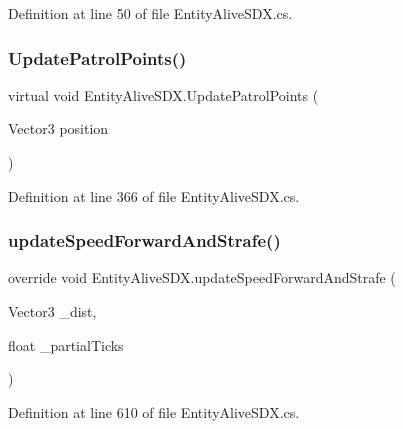 Definition at line 50 of file Entity\+Alive\+S\+D\+X.\+cs.

\mbox{\label{class_entity_alive_s_d_x_a7a31604214486ba310819d2f39be38cc}} 
\subsubsection{\texorpdfstring{UpdatePatrolPoints()}{UpdatePatrolPoints()}}
{\footnotesize\ttfamily virtual void Entity\+Alive\+S\+D\+X.\+Update\+Patrol\+Points (\begin{DoxyParamCaption}\item[{Vector3}]{position }\end{DoxyParamCaption})\hspace{0.3cm}{\ttfamily [virtual]}}



Definition at line 366 of file Entity\+Alive\+S\+D\+X.\+cs.

\mbox{\label{class_entity_alive_s_d_x_a30f867945827de24011036ebcba224de}} 
\subsubsection{\texorpdfstring{updateSpeedForwardAndStrafe()}{updateSpeedForwardAndStrafe()}}
{\footnotesize\ttfamily override void Entity\+Alive\+S\+D\+X.\+update\+Speed\+Forward\+And\+Strafe (\begin{DoxyParamCaption}\item[{Vector3}]{\+\_\+dist,  }\item[{float}]{\+\_\+partial\+Ticks }\end{DoxyParamCaption})\hspace{0.3cm}{\ttfamily [protected]}}



Definition at line 610 of file Entity\+Alive\+S\+D\+X.\+cs.

\mbox{\label{class_entity_alive_s_d_x_a10a0eb26cd594b2bc2afcfc4a065db56}} 
